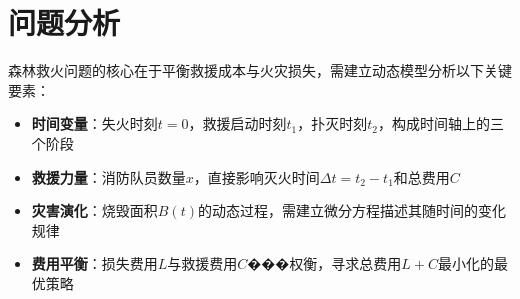 \section{问题分析}

森林救火问题的核心在于平衡救援成本与火灾损失，需建立动态模型分析以下关键要素：
\begin{itemize}[leftmargin=2em]
    \item \textbf{时间变量}：失火时刻$t=0$，救援启动时刻$t_1$，扑灭时刻$t_2$，构成时间轴上的三个阶段
    \item \textbf{救援力量}：消防队员数量$x$，直接影响灭火时间$\Delta t = t_2 - t_1$和总费用$C$
    \item \textbf{灾害演化}：烧毁面积$B(t)$的动态过程，需建立微分方程描述其随时间的变化规律
    \item \textbf{费用平衡}：损失费用$L$与救援费用$C$���权衡，寻求总费用$L + C$最小化的最优策略
\end{itemize}
